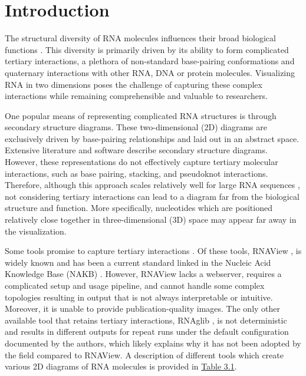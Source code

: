 \section{Introduction} 

The structural diversity of RNA molecules influences their broad biological functions \citep{Tomezsko2020, seemann2017identification, Mortimer2014}. This diversity \citep{Batey1999} is primarily driven by its ability to form complicated tertiary interactions, a plethora of non-standard base-pairing conformations and quaternary interactions with other RNA, DNA or protein molecules. Visualizing RNA in two dimensions poses the challenge of capturing these complex interactions while remaining comprehensible and valuable to researchers.
\par
One popular means of representing complicated RNA structures is through secondary structure diagrams. These two-dimensional (2D) diagrams are exclusively driven by base-pairing relationships and laid out in an abstract space. Extensive literature and software \citep{Johnson2023, Sweeney2021,Weinberg2011,Wiegreffe2019,Shabash2019,Peter2003,Byun2009,Darty2009,Kerpedjiev2015,Lu2018,Waterman1978} describe secondary structure diagrams. However, these representations do not effectively capture tertiary molecular interactions, such as base pairing, stacking, and pseudoknot interactions. Therefore, although this approach scales relatively well for large RNA sequences \citep{Johnson2023}, not considering tertiary interactions can lead to a diagram far from the biological structure and function. More specifically, nucleotides which are positioned relatively close together in three-dimensional (3D) space may appear far away in the visualization.
\par
Some tools promise to capture tertiary interactions \citep{Yang2003,Mallet2022}. Of these tools, RNAView \citep{Yang2003}, is widely known and has been a current standard linked in the Nucleic Acid Knowledge Base (NAKB) \citep{Lawson2024}. However, RNAView \citep{Yang2003} lacks a webserver, requires a complicated setup and usage pipeline, and cannot handle some complex topologies resulting in output that is not always interpretable or intuitive. Moreover, it is unable to provide publication-quality images. The only other available tool that retains tertiary interactions, RNAglib \citep{Mallet2022}, is not deterministic and results in different outputs for repeat runs under the default configuration documented by the authors, which likely explains why it has not been adopted by the field compared to RNAView. A description of different tools which create various 2D diagrams of RNA molecules is provided in \hyperref[table:rnascape]{Table 3.1}.
